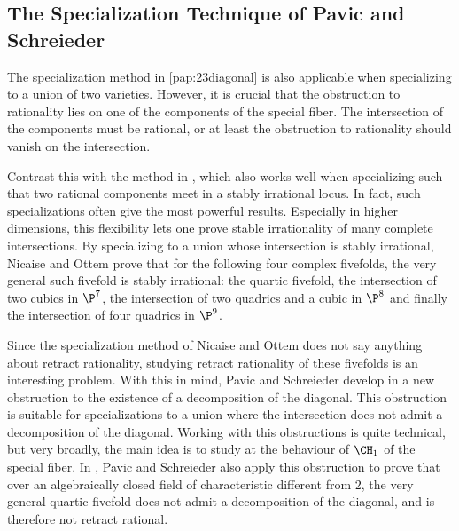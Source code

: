 \subsection{The Specialization Technique of Pavic and Schreieder}
The specialization method in \cref{pap:23diagonal} is also applicable when specializing to a union of two varieties. However, it is crucial that the obstruction to rationality lies on one of the components of the special fiber. The intersection of the components must be rational, or at least the obstruction to rationality should vanish on the intersection.

Contrast this with the method in \cite{NicaiseOttem}, which also works well when specializing such that two rational components meet in a stably irrational locus. In fact, such specializations often give the most powerful results. Especially in higher dimensions, this flexibility lets one prove stable irrationality of many complete intersections. By specializing to a union whose intersection is stably irrational, Nicaise and Ottem prove that for the following four complex fivefolds, the very general such fivefold is stably irrational: the quartic fivefold, the intersection of two cubics in $\P^7$, the intersection of two quadrics and a cubic in $\P^8$ and finally the intersection of four quadrics in $\P^9$.

Since the specialization method of Nicaise and Ottem does not say anything about retract rationality, studying retract rationality of these fivefolds is an interesting problem. With this in mind, Pavic and Schreieder develop in \cite{PavicSchreieder} a new obstruction to the existence of a decomposition of the diagonal. This obstruction is suitable for specializations to a union where the intersection does not admit a decomposition of the diagonal. Working with this obstructions is quite technical, but very broadly, the main idea is to study at the behaviour of $\CH_1$ of the special fiber.
In \cite{PavicSchreieder}, Pavic and Schreieder also apply this obstruction to prove that over an algebraically closed field of characteristic different from $2$, the very general quartic fivefold does not admit a decomposition of the diagonal, and is therefore not retract rational.

